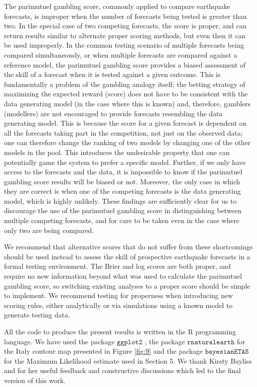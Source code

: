 \documentclass[referee,sn-basic]{sn-jnl}
\theoremstyle{thmstyleone}%
\theoremstyle{thmstyletwo}%
\theoremstyle{thmstylethree}%
\begin{document}
The parimutuel gambling score, commonly applied to compare earthquake forecasts, is improper when the number of forecasts being tested is greater than two. In the special case of two competing forecasts, the score is proper, and can return results similar to alternate proper scoring methods, but even then it can be used improperly. In the common testing scenario of multiple forecasts being compared simultaneously, or when multiple forecasts are compared against a reference model, the parimutuel gambling score provides a biased assessment of the skill of a forecast when it is tested against a given outcome. This is fundamentally a problem of the gambling analogy itself; the betting strategy of maximizing the expected reward (score) does not have to be consistent with the data generating model (in the case where this is known) and, therefore, gamblers (modellers) are not encouraged to provide forecasts resembling the data generating model. This is because the score for a given forecast is dependent on all the forecasts taking part in the competition, not just on the observed data; one can therefore change the ranking of two models by changing one of the other models in the pool. This introduces the undesirable property that one can potentially game the system to prefer a specific model. Further, if we only have access to the forecasts and the data, it is impossible to know if the parimutuel gambling score results will be biased or not. Moreover, the only case in which they are correct is when one of the competing forecasts is the data generating model, which is highly unlikely. These findings are sufficiently clear for us to discourage the use of the parimutuel gambling score in distinguishing between multiple competing forecasts, and for care to be taken even in the case where only two are being compared.

We recommend that alternative scores that do not suffer from these shortcomings should be used instead to assess the skill of prospective earthquake forecasts in a formal testing environment. The Brier and log scores are both proper, and require no new information beyond what was used to calculate the parimutuel gambling score, so switching existing analyses to a proper score should be simple to implement. We recommend testing for properness when introducing new scoring rules, either analytically or via simulations using a known model to generate testing data. 

All the code to produce the present results is written in the R programming language. We have used the package $\texttt{ggplot2}$ \citep{ggplot}, the package $\texttt{rnaturalearth}$ \citep{south2017rnaturalearth} for the Italy contour map presented in Figure \ref{fig:9} and the package $\texttt{bayesianETAS}$ \citep{ross2016bayesian}
for the Maximum Likelihood estimate used in Section 5. We thank Kirsty Bayliss and for her useful feedback and constructive discussions which led to the final version of this work.  
\end{document}
